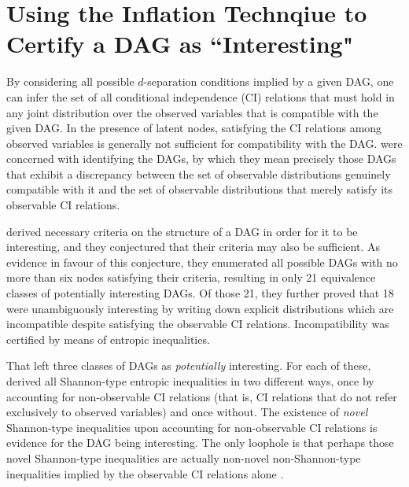 {\section{Using the Inflation Technqiue to Certify a DAG as ``Interesting"\label{sec:interestingproof}}

By considering all possible $d$-separation conditions implied by a given DAG, one can infer the set of all conditional independence (CI) relations that must hold in any joint distribution over the observed variables that is compatible with the given DAG. In the presence of latent nodes, satisfying the CI relations among observed variables 
is generally not sufficient for compatibility with the DAG. \citet{pusey2014gdag} were concerned with identifying the  DAGs, by which they mean precisely those DAGs that exhibit a discrepancy between the set of observable distributions genuinely compatible with it and the set of observable distributions that merely satisfy its observable CI relations.

\citet{pusey2014gdag} derived necessary criteria on the structure of a DAG in order for it to be interesting, and they conjectured that their criteria may also be sufficient. As evidence in favour of this conjecture, they enumerated all possible DAGs with no more than six nodes satisfying their criteria, resulting in 
only 21 equivalence classes of potentially interesting DAGs.
Of those 21, they further proved that 18 were unambiguously interesting by writing down explicit distributions which are incompatible despite satisfying the observable CI relations. Incompatibility was certified by means of entropic inequalities. 

That left three classes of DAGs  as \emph{potentially} interesting. For each of these, \citet{pusey2014gdag} derived all Shannon-type entropic inequalities in two different ways, once by accounting for non-observable CI relations (that is, CI relations that do not refer exclusively to observed variables) and once without. The existence of \emph{novel} Shannon-type inequalities upon accounting for non-observable CI relations is evidence for the DAG being interesting. The only loophole is that perhaps those novel Shannon-type inequalities are actually non-novel non-Shannon-type inequalities implied by the observable CI relations alone \cite{pusey2014gdag}. %

}
